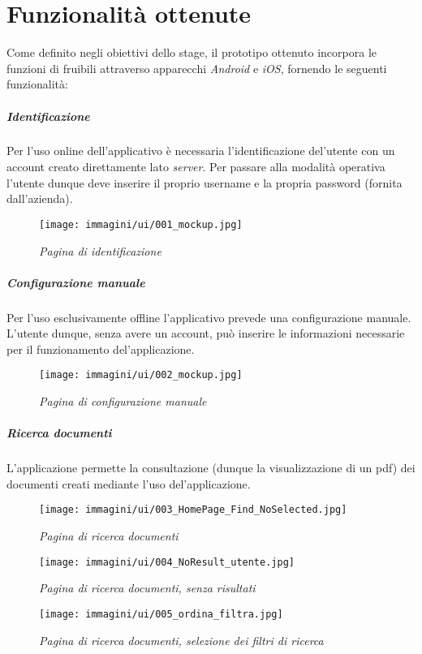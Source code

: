 \newpage
\chapter{Funzionalità ottenute}
\label{cap:funzionalità-ottenute}
Come definito negli obiettivi dello stage, il prototipo ottenuto incorpora le funzioni di \app fruibili attraverso apparecchi \textit{Android} e \textit{iOS}, fornendo le seguenti funzionalità:

\paragraph{Identificazione}
Per l'uso online dell'applicativo è necessaria l'identificazione del'utente con un account creato direttamente lato \textit{server}. Per passare alla modalità operativa l'utente dunque deve inserire il proprio username e la propria password (fornita dall'azienda).

\begin{figure}[ht]
	\centering
	\texttt{[image: immagini/ui/001\_mockup.jpg]}
	\caption{\textit{Pagina di identificazione}}
\end{figure}\FloatBarrier

\paragraph{Configurazione manuale}
Per l'uso esclusivamente offline l'applicativo prevede una configurazione manuale. L'utente dunque, senza avere un account, può inserire le informazioni necessarie per il funzionamento del'applicazione.

\begin{figure}[ht]
	\centering
	\texttt{[image: immagini/ui/002\_mockup.jpg]}
	\caption{\textit{Pagina di configurazione manuale}}
\end{figure}\FloatBarrier

\paragraph{Ricerca documenti}
L'applicazione permette la consultazione (dunque la visualizzazione di un pdf) dei documenti creati mediante l'uso del'applicazione.

\begin{figure}[ht]
	\centering
	\texttt{[image: immagini/ui/003\_HomePage\_Find\_NoSelected.jpg]}
	\caption{\textit{Pagina di ricerca documenti}}
\end{figure}\FloatBarrier
\begin{figure}[ht]
	\centering
	\texttt{[image: immagini/ui/004\_NoResult\_utente.jpg]}
	\caption{\textit{Pagina di ricerca documenti, senza risultati}}
\end{figure}\FloatBarrier
\begin{figure}[ht]
	\centering
	\texttt{[image: immagini/ui/005\_ordina\_filtra.jpg]}
	\caption{\textit{Pagina di ricerca documenti, selezione dei filtri di ricerca}}
\end{figure}\FloatBarrier

